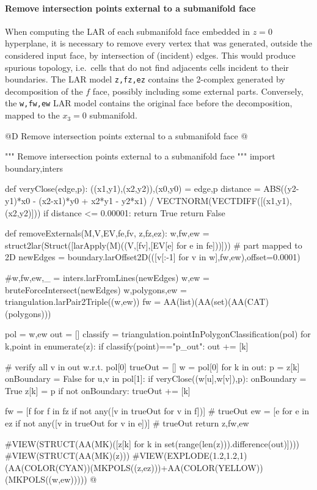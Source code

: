 \documentclass[11pt,oneside]{article}    %
\begin{document}
\paragraph{Remove intersection points external to a submanifold face}
When computing the LAR of each submanifold face embedded in $z=0$ hyperplane, it is necessary
to remove every vertex that was generated, outside the considered input face, by intersection of (incident) edges. This would produce spurious topology, i.e.~cells that do not find adjacents cells incident to their boundaries.
The LAR model \texttt{z,fz,ez} contains the 2-complex generated by decomposition of the $f$ face, possibly including some external parts.
Conversely, the \texttt{w,fw,ew} LAR model contains the original face before the decomposition, mapped to the $x_3=0$ submanifold.

@D Remove intersection points external to a submanifold face
@{""" Remove intersection points external to a submanifold face """
import boundary,inters

def veryClose(edge,p):
    ((x1,y1),(x2,y2)),(x0,y0) = edge,p
    distance = ABS((y2-y1)*x0 - (x2-x1)*y0 + x2*y1 - y2*x1) / VECTNORM(VECTDIFF([(x1,y1),(x2,y2)]))
    if distance <= 0.00001: return True
    return False
    
def removeExternals(M,V,EV,fe,fv, z,fz,ez):
    w,fw,ew = struct2lar(Struct([larApply(M)((V,[fv],[EV[e] for e in fe]))])) # part mapped to 2D
    newEdges = boundary.larOffset2D(([v[:-1] for v in w],fw,ew),offset=0.0001)

    #w,fw,ew,_ = inters.larFromLines(newEdges)
    w,ew = bruteForceIntersect(newEdges)
    w,polygons,ew = triangulation.larPair2Triple((w,ew))
    fw = AA(list)(AA(set)(AA(CAT)(polygons)))

    pol = w,ew
    out = []
    classify = triangulation.pointInPolygonClassification(pol)
    for k,point in enumerate(z):
        if classify(point)=="p_out":  out += [k]

    # verify all v in out w.r.t. pol[0]
    trueOut = []
    w = pol[0]
    for k in out: 
        p = z[k]
        onBoundary = False
        for u,v in pol[1]:
            if veryClose((w[u],w[v]),p):
                onBoundary = True
                z[k] = p
        if not onBoundary: trueOut += [k]
    
    fw = [f for f in fz if not any([v in trueOut for v in f])]  # trueOut
    ew = [e for e in ez if not any([v in trueOut for v in e])]  # trueOut
    return z,fw,ew
        
#VIEW(STRUCT(AA(MK)([z[k] for k in set(range(len(z))).difference(out)])))
#VIEW(STRUCT(AA(MK)(z)))
#VIEW(EXPLODE(1.2,1.2,1)(AA(COLOR(CYAN))(MKPOLS((z,ez)))+AA(COLOR(YELLOW))(MKPOLS((w,ew)))))
@}
\end{document}
